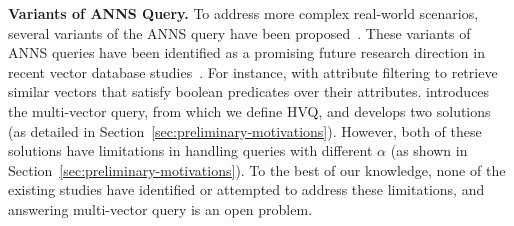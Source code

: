 \noindent\textbf{Variants of ANNS Query.} To address more complex real-world scenarios, several variants of the ANNS query have been proposed~\cite{pan2024vector}. These variants of ANNS queries have been identified as a promising future research direction in recent vector database studies~\cite{milvus2021,guo2022manu}. For instance, \cite{wei2020analyticdbv}  with attribute filtering to retrieve similar vectors that satisfy boolean predicates over their attributes. \cite{milvus2021} introduces the multi-vector query, from which we define HVQ, and develops two solutions (as detailed in Section~\ref{sec:preliminary-motivations}). %
However, both of these solutions have limitations in handling queries with different $\alpha$ (as shown in Section~\ref{sec:preliminary-motivations}). 
To the best of our knowledge, none of the existing studies have identified or attempted to address these limitations, and answering multi-vector query is an open problem. 







